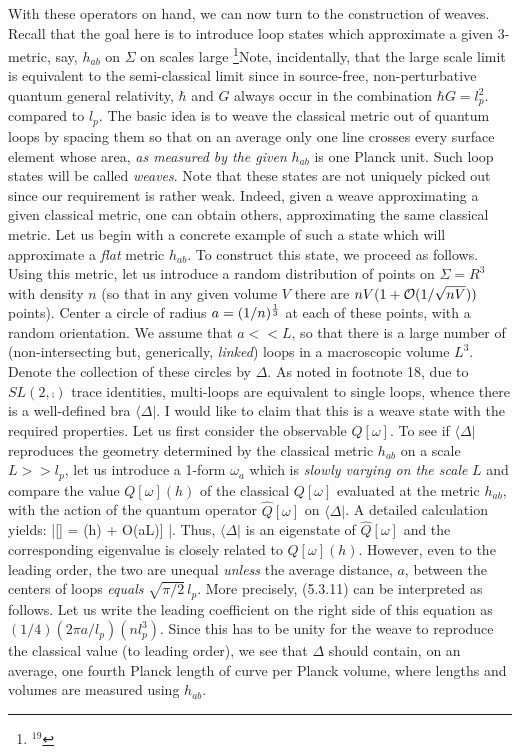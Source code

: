 With these operators on hand, we can now turn to the construction of
weaves. Recall that the goal here is to introduce loop states which
approximate a given 3-metric, say, $h_{ab}$ on $\Sigma$ on scales large%
\footnote{$^{19}$}{Note, incidentally, that the large scale limit is equivalent to
the semi-classical limit since in source-free, non-perturbative quantum
general relativity, $\hbar$ and $G$ always occur in the combination
$\hbar G = l_p^2$.}
compared to $l_p$. The basic idea is to weave the classical metric out of
quantum loops by spacing them so that on an average only one line crosses
every surface element whose area, {\it as measured by the given} $h_{ab}$
is one Planck unit. Such loop states will be called {\it weaves}. Note that
these states are not uniquely picked out since our requirement is rather weak.
Indeed, given a weave approximating a given classical metric, one can obtain
others, approximating the same classical metric. Let us begin with a concrete
example of such a state which will approximate a {\it flat} metric $h_{ab}$.
To construct this state, we proceed as follows. Using this metric, let us
introduce a random distribution of points on $\Sigma = R^3$ with density $n$
(so that in any given volume $V$ there are $nV(1+ {\cal O}(1/\sqrt{nV}))$
points). Center a circle of radius $a = (1/n)^{1\over 3}$ at each of these
points, with a random orientation. We assume that $a<< L$, so that there is a
large number of (non-intersecting but, generically, {\it linked}) loops in a
macroscopic volume $L^3$. Denote the collection of these circles by $\Delta$.
As noted in footnote 18, due to $SL(2,\comp )$ trace identities, multi-loops
are equivalent to single loops, whence there is a well-defined bra $\langle
\Delta|$. I would like to claim that this is a weave state with the required
properties. Let us first consider the observable $\hat{Q}[\omega]$. To see if
$\langle\Delta |$ reproduces the geometry determined by the classical metric
$h_{ab}$ on a scale $L>>l_p$, let us introduce a 1-form $\omega_a$ which is
{\it slowly varying on the scale} $L$ and compare the value $Q[\omega](h)$
of the classical $Q[\omega]$ evaluated at the metric $h_{ab}$, with the action
of the quantum operator $\hat{Q}[\omega]$ on $\langle\Delta|$. A detailed
calculation yields:
\bneq
\langle\Delta|\circ {}[\omega] =  \left[{\pi\over 2} \- \
({l_p\over a})^2 \, Q[w](h) + {\cal O}({a\over L})\right]\-  \cdot
\langle\Delta|.
Thus, $\langle\Delta|$ is an eigenstate of $\hat{Q}[\omega ]$ and the
corresponding eigenvalue is closely related to $Q[\omega](h)$. However, even
to the leading order, the two are unequal {\it unless} the average distance,
$a$, between the centers of loops {\it equals} $\sqrt{\pi/2}\, l_p$. More
precisely,  (5.3.11) can be interpreted as follows. Let us write the leading
coefficient on the right side of this equation as $(1/4)(2\pi a/l_p)(nl_p^3)$.
Since this has to be unity for the weave to reproduce the classical value (to
leading order), we see that $\Delta$ should  contain, on an average, one
fourth Planck length of curve per Planck volume, where lengths and volumes are
measured using $h_{ab}$.


